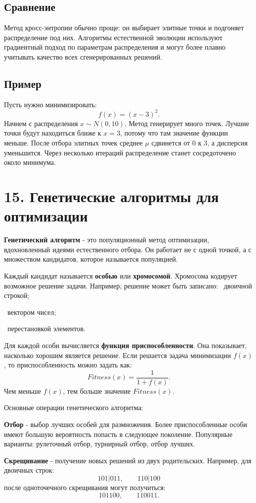 \documentclass[12pt,a4paper]{article}
\begin{document}
\subsection{Сравнение}
Метод кросс-энтропии обычно проще: он выбирает элитные точки и подгоняет распределение под них.
Алгоритмы естественной эволюции используют градиентный подход по параметрам распределения и могут более плавно учитывать качество всех сгенерированных решений.
\subsection{Пример}
Пусть нужно минимизировать:
\[
f(x)=(x-3)^2.
\]
Начнем с распределения $x\sim N(0,10)$.
Метод генерирует много точек. Лучшие точки будут находиться ближе к $x=3$, потому что там значение функции меньше.
После отбора элитных точек среднее $\mu$ сдвинется от $0$ к $3$, а дисперсия уменьшится. Через несколько итераций распределение станет сосредоточено около минимума.

\section{15. Генетические алгоритмы для оптимизации}
\textbf{Генетический алгоритм} - это популяционный метод оптимизации, вдохновленный идеями естественного отбора. Он работает не с одной точкой, а с множеством кандидатов, которое называется популяцией.

Каждый кандидат называется \textbf{особью} или \textbf{хромосомой}. Хромосома кодирует возможное решение задачи. Например, решение может быть записано:
\noindent\textbullet\ двоичной строкой;\par
\noindent\textbullet\ вектором чисел;\par
\noindent\textbullet\ перестановкой элементов.\par

Для каждой особи вычисляется \textbf{функция приспособленности}. Она показывает, насколько хорошим является решение. Если решается задача минимизации $f(x)$, то приспособленность можно задать как:
\[
Fitness(x)=\frac{1}{1+f(x)}.
\]
Чем меньше $f(x)$, тем больше значение $Fitness(x)$.

Основные операции генетического алгоритма:

\textbf{Отбор} - выбор лучших особей для размножения. Более приспособленные особи имеют большую вероятность попасть в следующее поколение. Популярные варианты: рулеточный отбор, турнирный отбор, отбор лучших.

\textbf{Скрещивание} - получение новых решений из двух родительских. Например, для двоичных строк:
\[
101|011,\qquad 110|100
\]
после одноточечного скрещивания могут получиться:
\[
101100,\qquad 110011.
\]
\end{document}
